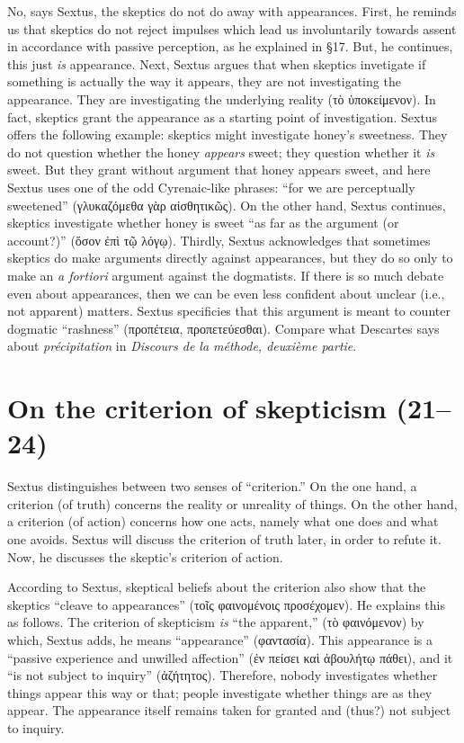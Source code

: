 No, says Sextus, the skeptics do not do away with appearances. First, he reminds us that skeptics do not reject impulses which lead us involuntarily towards assent in accordance with passive perception, as he explained in §17. But, he continues, this just \textit{is} appearance. Next, Sextus argues that when skeptics invetigate if something is actually the way it appears, they are not investigating the appearance. They are investigating the underlying reality (\textgreek{τὸ ὑποκείμενον}). In fact, skeptics grant the appearance as a starting point of investigation. Sextus offers the following example: skeptics might investigate honey's sweetness. They do not question whether the honey \textit{appears} sweet; they question whether it \textit{is} sweet. But they grant without argument that honey appears sweet, and here Sextus uses one of the odd Cyrenaic-like phrases: ``for we are perceptually sweetened'' (\textgreek{γλυκαζόμεθα γὰρ αἰσθητικῶς}). On the other hand, Sextus continues, skeptics investigate whether honey is sweet ``as far as the argument (or account?)'' (\textgreek{ὅσον ἐπὶ τῷ λόγῳ}). Thirdly, Sextus acknowledges that sometimes skeptics do make arguments directly against appearances, but they do so only to make an \textit{a fortiori} argument against the dogmatists. If there is so much debate even about appearances, then we can be even less confident about unclear (i.e., not apparent) matters. Sextus specificies that this argument is meant to counter dogmatic ``rashness'' (\textgreek{προπέτεια, προπετεύεσθαι}). Compare what Descartes says about \textit{précipitation} in \textit{Discours de la méthode, deuxième partie}.\autocite[][69, especially Gilson's note 1]{gilson2016}

\section{On the criterion of skepticism (21--24)}

Sextus distinguishes between two senses of ``criterion.'' On the one hand, a criterion (of truth) concerns the reality or unreality of things. On the other hand, a criterion (of action) concerns how one acts, namely what one does and what one avoids. Sextus will discuss the criterion of truth later, in order to refute it. Now, he discusses the skeptic's criterion of action.

According to Sextus, skeptical beliefs about the criterion also show that the skeptics ``cleave to appearances'' (\textgreek{τοῖς φαινομένοις προσέχομεν}). He explains this as follows. The criterion of skepticism \textit{is} ``the apparent,'' (\textgreek{τὸ φαινόμενον}) by which, Sextus adds, he means ``appearance'' (\textgreek{φαντασία}). This appearance is a ``passive experience and unwilled affection'' (\textgreek{ἐν πείσει καὶ ἀβουλήτῳ πάθει}), and it ``is not subject to inquiry'' (\textgreek{ἀζήτητος}). Therefore, nobody investigates whether things appear this way or that; people investigate whether things are as they appear. The appearance itself remains taken for granted and (thus?) not subject to inquiry.

